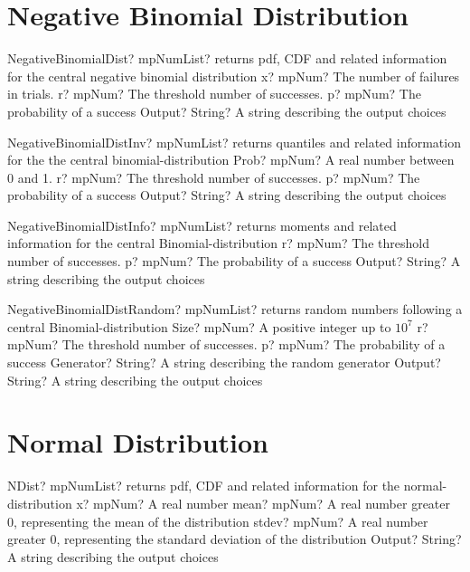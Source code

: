 \documentclass[12pt,a4paper,openany]{book}
\begin{document}
\section{Negative Binomial Distribution}

\begin{mpFunctionsExtract}
\mpFunctionFour
{NegativeBinomialDist? mpNumList? returns pdf, CDF and related information for the central negative binomial distribution}
{x? mpNum? The number of failures in trials.}
{r? mpNum? The threshold number of successes.}
{p? mpNum? The probability of a success}
{Output? String? A string describing the output choices}
\end{mpFunctionsExtract}

\begin{mpFunctionsExtract}
\mpFunctionFour
{NegativeBinomialDistInv? mpNumList? returns quantiles and related information for the the central binomial-distribution}
{Prob? mpNum? A real number between 0 and 1.}
{r? mpNum? The threshold number of successes.}
{p? mpNum? The probability of a success}
{Output? String? A string describing the output choices}
\end{mpFunctionsExtract}

\begin{mpFunctionsExtract}
\mpFunctionThree
{NegativeBinomialDistInfo? mpNumList? returns moments and related information for the central Binomial-distribution}
{r? mpNum? The threshold number of successes.}
{p? mpNum? The probability of a success}
{Output? String? A string describing the output choices}
\end{mpFunctionsExtract}

\begin{mpFunctionsExtract}
\mpFunctionFive
{NegativeBinomialDistRandom? mpNumList? returns random numbers following a central Binomial-distribution}
{Size? mpNum? A positive integer up to $10^7$}
{r? mpNum? The threshold number of successes.}
{p? mpNum? The probability of a success}
{Generator? String? A string describing the random generator}
{Output? String? A string describing the output choices}
\end{mpFunctionsExtract}

\section{Normal Distribution}

\begin{mpFunctionsExtract}
\mpFunctionFour
{NDist? mpNumList? returns pdf, CDF and related information for the normal-distribution}
{x? mpNum? A real number}
{mean? mpNum? A real number greater 0, representing the mean of the distribution}
{stdev? mpNum? A real number greater 0, representing the standard deviation of the distribution}
{Output? String? A string describing the output choices}
\end{mpFunctionsExtract}
\end{document}
